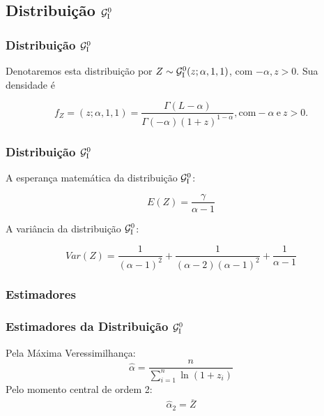 
\subsection{Distribuição $\mathcal{G}_{\rm I}^{0}$}

\begin{frame}
\frametitle{Distribui\c c\~ ao $\mathcal{G}_{\rm I}^{0}$}

Denotaremos esta distribuição por $Z\sim\mathcal{G}_{\rm I}^{0}(z; \alpha,1,1)$, com $-\alpha, z>0$. Sua densidade é

\begin{displaymath}
f_{Z}=(z;\alpha,1,1)=\dfrac{\Gamma(L-\alpha)}{\Gamma(-\alpha)(1+z)^{1-\alpha}}, \mbox{com} -\alpha \ \mbox{e}\ z>0.
\end{displaymath}


\end{frame}

\begin{frame}
\frametitle{Distribui\c c\~ ao $\mathcal{G}_{\rm I}^{0}$}

A esperança matemática da distribuição $\mathcal{G}_{\rm I}^{0}$:

\begin{equation}
\label{eq:Gi0_esp}
E(Z)=\dfrac{\gamma}{\alpha-1}
\end{equation}\pause

A variância da distribuição $\mathcal{G}_{\rm I}^{0}$:

\begin{equation}
\label{eq:Gi0_var}
Var(Z)=\dfrac{1}{(\alpha-1)^2}+\dfrac{1}{(\alpha-2)(\alpha-1)^2}+\dfrac{1}{\alpha-1}
\end{equation}

\end{frame}

\subsubsection{Estimadores}
\begin{frame}
\frametitle{Estimadores da Distribuição $\mathcal{G}_{\rm I}^{0}$}
Pela Máxima Veressimilhança:
\begin{equation}
\label{eq:Gi0_MV}
\hat{\alpha}=\dfrac{n}{\displaystyle\sum_{i=1}^{n}\ln(1+z_i)}
\end{equation} \pause
Pelo momento central de ordem 2:
\begin{eqnarray}
\label{eq:Gi0_m_p2}
\hat{\alpha}_2=\overline{Z}
\end{eqnarray}
\end{frame}

